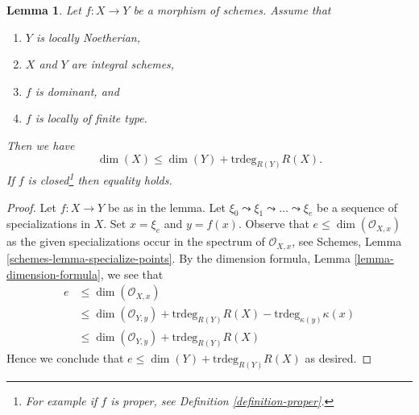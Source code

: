 \documentclass[10pt,a4paper]{amsart}
\theoremstyle{plain}
\newtheorem{lemma}[subsection]{Lemma}
\theoremstyle{definition}
\theoremstyle{remark}
\numberwithin{equation}{subsection}
\begin{document}
\begin{lemma}
\label{lemma-alteration-dimension}
Let $f : X \to Y$ be a morphism of schemes. Assume that
\begin{enumerate}
\item $Y$ is locally Noetherian,
\item $X$ and $Y$ are integral schemes,
\item $f$ is dominant, and
\item $f$ is locally of finite type.
\end{enumerate}
Then we have
$$
\dim(X) \leq \dim(Y) + \text{trdeg}_{R(Y)} R(X).
$$
If $f$ is closed\footnote{For example if $f$ is proper, see
Definition \ref{definition-proper}.} then equality holds.
\end{lemma}

\begin{proof}
Let $f : X \to Y$ be as in the lemma.
Let $\xi_0 \leadsto \xi_1 \leadsto \ldots \leadsto \xi_e$ be
a sequence of specializations in $X$. Set $x = \xi_e$
and $y = f(x)$. Observe that $e \leq \dim(\mathcal{O}_{X, x})$
as the given specializations occur in the spectrum of
$\mathcal{O}_{X, x}$, see Schemes, Lemma \ref{schemes-lemma-specialize-points}.
By the dimension formula, Lemma \ref{lemma-dimension-formula},
we see that
\begin{align*}
e & \leq \dim(\mathcal{O}_{X, x}) \\
& \leq \dim(\mathcal{O}_{Y, y}) +
\text{trdeg}_{R(Y)} R(X) - \text{trdeg}_{\kappa(y)} \kappa(x) \\
& \leq \dim(\mathcal{O}_{Y, y}) + \text{trdeg}_{R(Y)} R(X)
\end{align*}
Hence we conclude that $e \leq \dim(Y) + \text{trdeg}_{R(Y)} R(X)$ as desired.


\end{proof}
\end{document}
